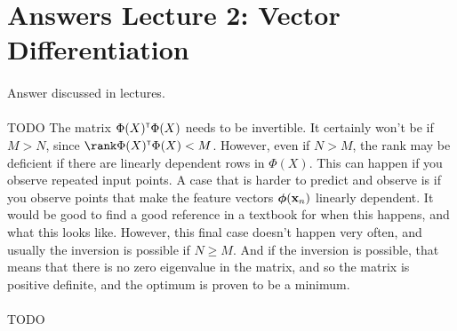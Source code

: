 \section{Answers Lecture 2: Vector Differentiation}
\paragraph{} Answer discussed in lectures.

\paragraph{} TODO
The matrix $\Phi(X)^\mathrm{\textsf{\tiny T}}\Phi(X)$ needs to be invertible. It certainly won't be if $M > N$, since $\rank \Phi(X)\transpose\Phi(X) < M$. However, even if $N>M$, the rank may be deficient if there are linearly dependent rows in $\Phi(X)$. This can happen if you observe repeated input points. A case that is harder to predict and observe is if you observe points that make the feature vectors $\boldsymbol{\phi}(\mathbf{x}_n)$ linearly dependent. It would be good to find a good reference in a textbook for when this happens, and what this looks like. However, this final case doesn't happen very often, and usually the inversion is possible if $N \geq M$. And if the inversion is possible, that means that there is no zero eigenvalue in the matrix, and so the matrix is positive definite, and the optimum is proven to be a minimum.

\paragraph{} TODO

